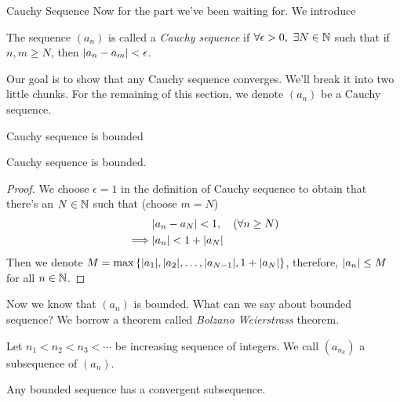 \documentclass{beamer}
\begin{document}
\begin{frame}{Cauchy Sequence}
  Now for the part we've been waiting for.
  We introduce
  \pause
  \begin{definition}
    The sequence $(a_n)$ is called a \emph{Cauchy sequence} if 
    $\forall \epsilon>0,~ \exists N\in\N$ such that
    if $n,m\geq N$, then $\lvert a_n-a_m\rvert<\epsilon$.
  \end{definition}
  \pause
  Our goal is to show that any Cauchy sequence converges. We'll break it
  into two little chunks.
  \pause
  For the remaining of this section, we denote $(a_n)$ be a Cauchy sequence.
\end{frame}
\begin{frame}{Cauchy sequence is bounded}
  \begin{lemma}
    Cauchy sequence is bounded.
  \end{lemma}
  \pause
  \begin{proof}
    We choose $\epsilon=1$ in the definition of Cauchy sequence to obtain
    that there's an $N\in\N$ such that (choose $m=N$)
    \begin{align*}
      &\lvert a_n-a_N\rvert<1, \quad (\forall n\geq N)\\\implies
      &\lvert a_n\rvert<1+\lvert a_N\rvert
    \end{align*}
    \pause
    Then we denote 
    $M=\max\left\{\lvert a_1\rvert,\lvert a_2\rvert,\dots,\lvert a_{N-1}\rvert, 1+\lvert a_N\rvert\right\}$,
    \pause
    therefore, $\lvert a_n\rvert\leq M$ for all $n\in\N$.
  \end{proof}
\end{frame}

\begin{frame}
  Now we know that $(a_n)$ is bounded. What can we say about bounded sequence?
  We borrow a theorem called \emph{Bolzano Weierstrass} theorem.
  \begin{definition}[Subsequence]
    Let $n_1<n_2<n_3<\cdots$ be increasing sequence of integers.
    We call $(a_{n_k})$ a subsequence of $(a_n)$.
  \end{definition}
  \begin{theorem}
    Any bounded sequence has a convergent subsequence.
  \end{theorem}
\end{frame}
\end{document}
